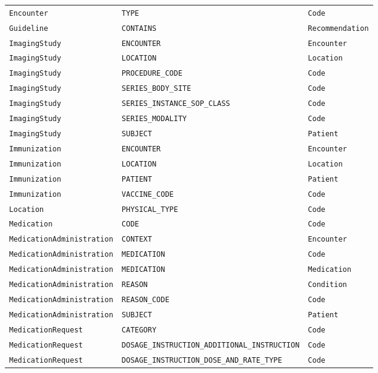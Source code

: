 \begin{longtable}{@{}p{46mm}p{52mm}p{40mm}@{}}
\texttt{Encounter} & \texttt{TYPE} & \texttt{Code} \\
\texttt{Guideline} & \texttt{CONTAINS} & \texttt{Recommendation} \\
\texttt{ImagingStudy} & \texttt{ENCOUNTER} & \texttt{Encounter} \\
\texttt{ImagingStudy} & \texttt{LOCATION} & \texttt{Location} \\
\texttt{ImagingStudy} & \texttt{PROCEDURE\_CODE} & \texttt{Code} \\
\texttt{ImagingStudy} & \texttt{SERIES\_BODY\_SITE} & \texttt{Code} \\
\texttt{ImagingStudy} & \texttt{SERIES\_INSTANCE\_SOP\_CLASS} & \texttt{Code} \\
\texttt{ImagingStudy} & \texttt{SERIES\_MODALITY} & \texttt{Code} \\
\texttt{ImagingStudy} & \texttt{SUBJECT} & \texttt{Patient} \\
\texttt{Immunization} & \texttt{ENCOUNTER} & \texttt{Encounter} \\
\texttt{Immunization} & \texttt{LOCATION} & \texttt{Location} \\
\texttt{Immunization} & \texttt{PATIENT} & \texttt{Patient} \\
\texttt{Immunization} & \texttt{VACCINE\_CODE} & \texttt{Code} \\
\texttt{Location} & \texttt{PHYSICAL\_TYPE} & \texttt{Code} \\
\texttt{Medication} & \texttt{CODE} & \texttt{Code} \\
\texttt{MedicationAdministration} & \texttt{CONTEXT} & \texttt{Encounter} \\
\texttt{MedicationAdministration} & \texttt{MEDICATION} & \texttt{Code} \\
\texttt{MedicationAdministration} & \texttt{MEDICATION} & \texttt{Medication} \\
\texttt{MedicationAdministration} & \texttt{REASON} & \texttt{Condition} \\
\texttt{MedicationAdministration} & \texttt{REASON\_CODE} & \texttt{Code} \\
\texttt{MedicationAdministration} & \texttt{SUBJECT} & \texttt{Patient} \\
\texttt{MedicationRequest} & \texttt{CATEGORY} & \texttt{Code} \\
\texttt{MedicationRequest} & \texttt{DOSAGE\_INSTRUCTION\_ADDITIONAL\_INSTRUCTION} & \texttt{Code} \\
\texttt{MedicationRequest} & \texttt{DOSAGE\_INSTRUCTION\_DOSE\_AND\_RATE\_TYPE} & \texttt{Code} \\

\end{longtable}
